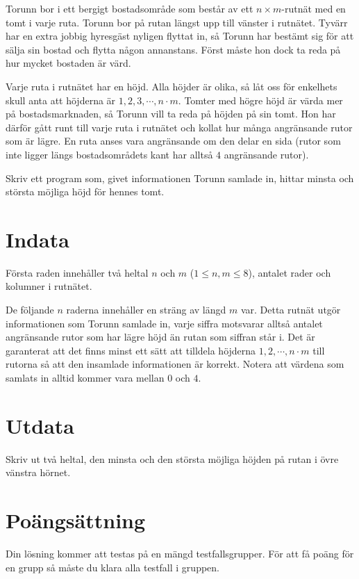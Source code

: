 

\noindent
Torunn bor i ett bergigt bostadsområde som består av ett $n \times m$-rutnät med en tomt i varje ruta.
Torunn bor på rutan längst upp till vänster i rutnätet.
Tyvärr har en extra jobbig hyresgäst nyligen flyttat in, så Torunn har bestämt sig för att sälja sin bostad och flytta någon annanstans.
Först måste hon dock ta reda på hur mycket bostaden är värd.

Varje ruta i rutnätet har en höjd. Alla höjder är olika, så låt oss för enkelhets skull anta att höjderna är $1, 2, 3, \cdots, n\cdot m$.
Tomter med högre höjd är värda mer på bostadsmarknaden, så Torunn vill ta reda på höjden på sin tomt. Hon har därför gått runt till varje ruta i rutnätet och kollat hur många angränsande rutor som är lägre.
En ruta anses vara angränsande om den delar en sida (rutor som inte ligger längs bostadsområdets kant har alltså $4$ angränsande rutor).

Skriv ett program som, givet informationen Torunn samlade in, hittar minsta och största möjliga höjd för hennes tomt.

\section*{Indata}
Första raden innehåller två heltal $n$ och $m$ ($1 \leq n,m \leq 8$), antalet rader och kolumner i rutnätet.

De följande $n$ raderna innehåller en sträng av längd $m$ var.
Detta rutnät utgör informationen som Torunn samlade in, varje siffra motsvarar alltså antalet angränsande rutor som har lägre höjd än rutan som siffran står i.
Det är garanterat att det finns minst ett sätt att tilldela höjderna $1, 2, \cdots, n\cdot m$ till rutorna så att den insamlade informationen är korrekt.
Notera att värdena som samlats in alltid kommer vara mellan $0$ och $4$.

\section*{Utdata}
Skriv ut två heltal, den minsta och den största möjliga höjden på rutan i övre vänstra hörnet.

\section*{Poängsättning}
Din lösning kommer att testas på en mängd testfallsgrupper.
För att få poäng för en grupp så måste du klara alla testfall i gruppen.

